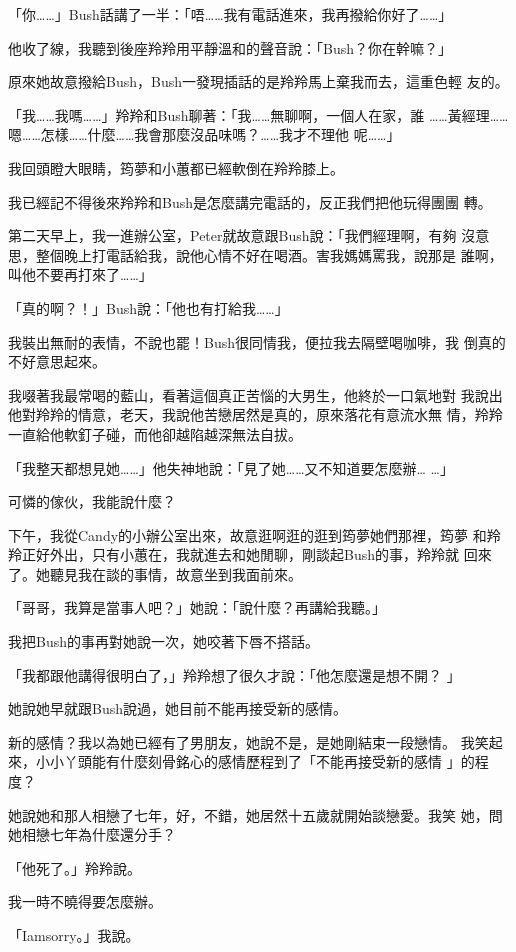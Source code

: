 「你……」Bush話講了一半：「唔……我有電話進來，我再撥給你好了……」

他收了線，我聽到後座羚羚用平靜溫和的聲音說：「Bush？你在幹嘛？」

原來她故意撥給Bush，Bush一發現插話的是羚羚馬上棄我而去，這重色輕
友的。

「我……我嗎……」羚羚和Bush聊著：「我……無聊啊，一個人在家，誰
……黃經理……嗯……怎樣……什麼……我會那麼沒品味嗎？……我才不理他
呢……」

我回頭瞪大眼睛，筠夢和小蕙都已經軟倒在羚羚膝上。

我已經記不得後來羚羚和Bush是怎麼講完電話的，反正我們把他玩得團團
轉。

第二天早上，我一進辦公室，Peter就故意跟Bush說：「我們經理啊，有夠
沒意思，整個晚上打電話給我，說他心情不好在喝酒。害我媽媽罵我，說那是
誰啊，叫他不要再打來了……」

「真的啊？！」Bush說：「他也有打給我……」

我裝出無耐的表情，不說也罷！Bush很同情我，便拉我去隔壁喝咖啡，我
倒真的不好意思起來。

我啜著我最常喝的藍山，看著這個真正苦惱的大男生，他終於一口氣地對
我說出他對羚羚的情意，老天，我說他苦戀居然是真的，原來落花有意流水無
情，羚羚一直給他軟釘子碰，而他卻越陷越深無法自拔。

「我整天都想見她……」他失神地說：「見了她……又不知道要怎麼辦…
…」

可憐的傢伙，我能說什麼？

下午，我從Candy的小辦公室出來，故意逛啊逛的逛到筠夢她們那裡，筠夢
和羚羚正好外出，只有小蕙在，我就進去和她閒聊，剛談起Bush的事，羚羚就
回來了。她聽見我在談的事情，故意坐到我面前來。

「哥哥，我算是當事人吧？」她說：「說什麼？再講給我聽。」

我把Bush的事再對她說一次，她咬著下唇不搭話。

「我都跟他講得很明白了，」羚羚想了很久才說：「他怎麼還是想不開？
」

她說她早就跟Bush說過，她目前不能再接受新的感情。

新的感情？我以為她已經有了男朋友，她說不是，是她剛結束一段戀情。
我笑起來，小小丫頭能有什麼刻骨銘心的感情歷程到了「不能再接受新的感情
」的程度？

她說她和那人相戀了七年，好，不錯，她居然十五歲就開始談戀愛。我笑
她，問她相戀七年為什麼還分手？

「他死了。」羚羚說。

我一時不曉得要怎麼辦。

「Iamsorry。」我說。

